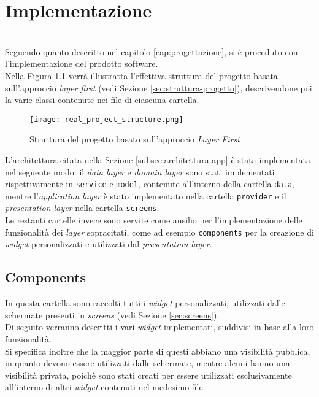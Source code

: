 \chapter{Implementazione}
\label{cap:implementazione}

\\

Seguendo quanto descritto nel capitolo \ref{cap:progettazione}, si è proceduto con l'implementazione del prodotto software.\\
Nella Figura \ref{fig:real-project-structure} verrà illustratta l'effettiva struttura del progetto basata sull'approccio \emph{layer first} (vedi Sezione \ref{sec:struttura-progetto}), descrivendone poi la varie classi contenute nei file di ciascuna cartella. \\

\begin{figure}[!h] 
    \centering 
    \texttt{[image: real\_project\_structure.png]}
    \caption{Struttura del progetto basato sull'approccio \emph{Layer First}}
    \label{fig:real-project-structure}
\end{figure}

L'architettura citata nella Sezione \ref{subsec:architettura-app} è stata implementata nel seguente modo: il \emph{data layer} e \emph{domain layer} sono stati implementati rispettivamente in \lstinline{service} e \lstinline{model}, contenute all'interno della cartella \lstinline{data}, mentre l'\emph{application layer} è stato implementato nella cartella \lstinline{provider} e il \emph{presentation layer} nella cartella \lstinline{screens}.\\
Le restanti cartelle invece sono servite come ausilio per l'implementazione delle funzionalità dei \emph{layer} sopracitati, come ad esempio \lstinline{components} per la creazione di \emph{widget} personalizzati e utilizzati dal \emph{presentation layer}.

\section{Components}
\label{sec:components}

In questa cartella sono raccolti tutti i \emph{widget} personalizzati, utilizzati dalle schermate presenti in \emph{screens} (vedi Sezione \ref{sec:screens}).\\
Di seguito verranno descritti i vari \emph{widget} implementati, suddivisi in base alla loro funzionalità.\\
Si specifica inoltre che la maggior parte di questi abbiano una visibilità pubblica, in quanto devono essere utilizzati dalle schermate, mentre alcuni hanno una visibilità privata, poichè sono stati creati per essere utilizzati esclusivamente all'interno di altri \emph{widget} contenuti nel medesimo file.


